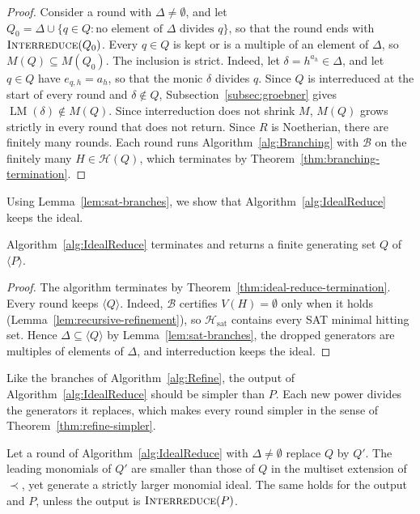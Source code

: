 \begin{proof}
  Consider a round with $\Delta\neq\emptyset$, and let
  $Q_0=\Delta\cup\{q\in Q:\text{no element of $\Delta$ divides $q$}\}$, so that
  the round ends with $\Call{Interreduce}{Q_0}$. Every $q\in Q$ is kept or is a
  multiple of an element of $\Delta$, so $M(Q)\subseteq M(Q_0)$. The inclusion
  is strict. Indeed, let $\delta=h^{a_h}\in\Delta$, and let $q\in Q$ have
  $e_{q,h}=a_h$, so that the monic $\delta$ divides $q$. Since $Q$ is
  interreduced at the start of every round and $\delta\notin Q$,
  Subsection~\ref{subsec:groebner} gives $\operatorname{LM}(\delta)\notin M(Q)$.
  Since interreduction does not shrink $M$, $M(Q)$ grows strictly in every
  round that does not return. Since $R$ is Noetherian, there are finitely many
  rounds. Each round runs Algorithm~\ref{alg:Branching} with $\mathcal B$ on the
  finitely many $H\in\mathcal H(Q)$, which terminates by
  Theorem~\ref{thm:branching-termination}.
\end{proof}

Using Lemma~\ref{lem:sat-branches}, we show that
Algorithm~\ref{alg:IdealReduce} keeps the ideal.

\begin{theorem}
  \label{thm:ideal-reduce}
  Algorithm~\ref{alg:IdealReduce} terminates and returns a finite
  generating set $Q$ of $\langle P\rangle$.
\end{theorem}

\begin{proof}
  The algorithm terminates by Theorem~\ref{thm:ideal-reduce-termination}.
  Every round keeps $\langle Q\rangle$. Indeed, $\mathcal B$ certifies
  $V(H)=\emptyset$ only when it holds (Lemma~\ref{lem:recursive-refinement}), so
  $\mathcal H_{\mathrm{sat}}$ contains every SAT minimal hitting set. Hence
  $\Delta\subseteq\langle Q\rangle$ by Lemma~\ref{lem:sat-branches}, the dropped
  generators are multiples of elements of $\Delta$, and interreduction keeps the
  ideal.
\end{proof}

Like the branches of Algorithm~\ref{alg:Refine}, the output of
Algorithm~\ref{alg:IdealReduce} should be simpler than $P$. Each new power
divides the generators it replaces, which makes every round simpler in the
sense of Theorem~\ref{thm:refine-simpler}.

\begin{theorem}
  \label{thm:ideal-reduce-simpler}
  Let a round of Algorithm~\ref{alg:IdealReduce} with $\Delta\neq\emptyset$
  replace $Q$ by $Q'$. The leading monomials of $Q'$ are smaller than those of
  $Q$ in the multiset extension of $\prec$, yet generate a strictly larger
  monomial ideal. The same holds for the output and $P$, unless the output is
  $\Call{Interreduce}{P}$.
\end{theorem}

